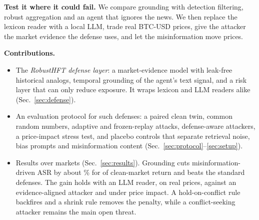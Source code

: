 \textbf{Test it where it could fail.} We compare grounding with detection filtering, robust aggregation and an agent that ignores the news. We then replace the lexicon reader with a local LLM, trade real BTC-USD prices, give the attacker the market evidence the defense uses, and let the misinformation move prices.

\textbf{Contributions.}
\begin{itemize}
\item The \emph{RobustHFT defense layer}: a market-evidence model with leak-free historical analogs, temporal grounding of the agent's text signal, and a risk layer that can only reduce exposure. It wraps lexicon and LLM readers alike (Sec.~\ref{sec:defense}).
\item An evaluation protocol for such defenses: a paired clean twin, common random numbers, adaptive and frozen-replay attacks, defense-aware attackers, a price-impact stress test, and placebo controls that separate retrieval noise, bias prompts and misinformation content (Sec.~\ref{sec:protocol}--\ref{sec:setup}).
\item Results over  markets (Sec.~\ref{sec:results}). Grounding cuts misinformation-driven ASR by about \% for \pp{} of clean-market return and beats the standard defenses. The gain holds with an LLM reader, on real prices, against an evidence-aligned attacker and under price impact. A hold-on-conflict rule backfires and a shrink rule removes the penalty, while a conflict-seeking attacker remains the main open threat.
\end{itemize}
